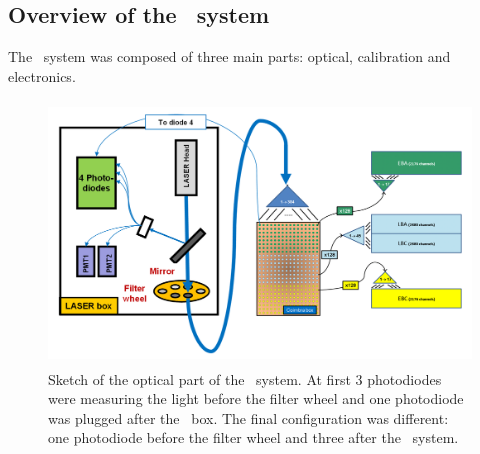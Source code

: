 


\subsection{Overview of the \lasi~system}

The \lasa~system \cite{ref:lasercalvet} was composed of three main parts: optical, calibration and electronics.

\begin{figure}[htbp]
\centering
\includegraphics[height=7cm]{figures/FullSystem.png}
\caption{Sketch of the optical part of the \lasi~system. At first 3 photodiodes were measuring the light before the filter wheel and one photodiode was plugged after the \coimbra~box. The final configuration was different: one photodiode before the filter wheel and three after the \coimbra~system.}\label{fig:lasaoptical}
\end{figure}


